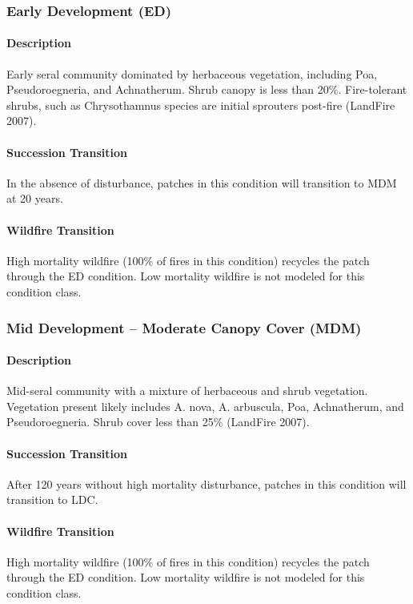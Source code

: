 \subsubsection{Early Development (ED)} 

\paragraph{Description} Early seral community dominated by herbaceous vegetation, including Poa, Pseudoroegneria, and Achnatherum. Shrub canopy is less than 20\%. Fire-tolerant shrubs, such as Chrysothamnus species are initial sprouters post-fire (LandFire 2007).

\paragraph{Succession Transition} In the absence of disturbance, patches in this condition will transition to MDM at 20 years. 

\paragraph{Wildfire Transition} High mortality wildfire (100\% of fires in this condition) recycles the patch through the ED condition. Low mortality wildfire is not modeled for this condition class.

\hrulefill


\subsubsection{Mid Development – Moderate Canopy Cover (MDM)}

\paragraph{Description} Mid-seral community with a mixture of herbaceous and shrub vegetation. Vegetation present likely includes A. nova, A. arbuscula, Poa, Achnatherum, and Pseudoroegneria.  Shrub cover less than 25\% (LandFire 2007).

\paragraph{Succession Transition} After 120 years without high mortality disturbance, patches in this condition will transition to LDC. 

\paragraph{Wildfire Transition} High mortality wildfire (100\% of fires in this condition) recycles the patch through the ED condition. Low mortality wildfire is not modeled for this condition class.

